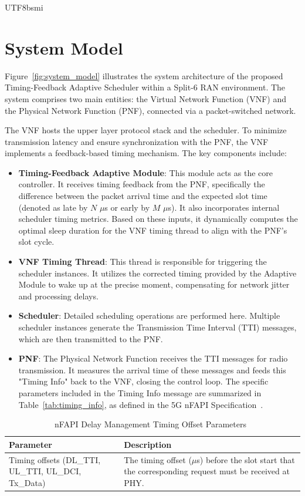 \documentclass[conference]{IEEEtran}
\begin{document}
\begin{CJK}{UTF8}{bsmi}
\section{System Model}
\label{sec:system_model}

{\color{blue}
Figure~\ref{fig:system_model} illustrates the system architecture of the proposed Timing-Feedback Adaptive Scheduler within a Split-6 RAN environment. The system comprises two main entities: the Virtual Network Function (VNF) and the Physical Network Function (PNF), connected via a packet-switched network.

The VNF hosts the upper layer protocol stack and the scheduler. To minimize transmission latency and ensure synchronization with the PNF, the VNF implements a feedback-based timing mechanism. The key components include:

\begin{itemize}
    \item \textbf{Timing-Feedback Adaptive Module}: This module acts as the core controller. It receives timing feedback from the PNF, specifically the difference between the packet arrival time and the expected slot time (denoted as late by $N$ $\mu$s or early by $M$ $\mu$s). It also incorporates internal scheduler timing metrics. Based on these inputs, it dynamically computes the optimal sleep duration for the VNF timing thread to align with the PNF's slot cycle.
    \item \textbf{VNF Timing Thread}: This thread is responsible for triggering the scheduler instances. It utilizes the corrected timing provided by the Adaptive Module to wake up at the precise moment, compensating for network jitter and processing delays.
    \item \textbf{Scheduler}: Detailed scheduling operations are performed here. Multiple scheduler instances generate the Transmission Time Interval (TTI) messages, which are then transmitted to the PNF.
    \item \textbf{PNF}: The Physical Network Function receives the TTI messages for radio transmission. It measures the arrival time of these messages and feeds this "Timing Info" back to the VNF, closing the control loop. The specific parameters included in the Timing Info message are summarized in Table~\ref{tab:timing_info}, as defined in the 5G nFAPI Specification~\cite{nfapi_spec}.
\end{itemize}
}

\begin{table}[htbp]
\caption{nFAPI Delay Management Timing Offset Parameters~\cite{nfapi_spec}}
\label{tab:delay_mgmt_offsets}
\begin{center}
\begin{tabularx}{\columnwidth}{X|X}
\toprule
\textbf{Parameter} & \textbf{Description} \\ \midrule
Timing offsets (DL\_TTI, UL\_TTI, UL\_DCI, Tx\_Data) & The timing offset ($\mu$s) before the slot start that the corresponding request must be received at PHY. \\ \bottomrule
\end{tabularx}
\end{center}
\end{table}


\end{CJK}
\end{document}
